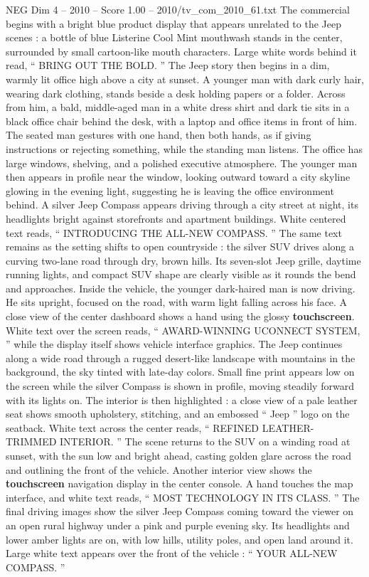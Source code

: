 \begin{textsample}{NEG Dim 4 – 2010 – Score 1.00 – 2010/tv\_com\_2010\_61.txt}  \label{ex:f4_neg_079}
The commercial begins with a bright blue product display that appears unrelated to the Jeep scenes : a bottle of blue Listerine Cool Mint mouthwash stands in the center, surrounded by small cartoon-like mouth characters.
Large white words behind it read, “ BRING OUT THE BOLD. ” The Jeep story then begins in a dim, warmly lit office high above a city at sunset.
A younger man with dark curly hair, wearing dark clothing, stands beside a desk holding papers or a folder.
Across from him, a bald, middle-aged man in a white dress shirt and dark tie sits in a black office chair behind the desk, with a laptop and office items in front of him.
The seated man gestures with one hand, then both hands, as if giving instructions or rejecting something, while the standing man listens.
The office has large windows, shelving, and a polished executive atmosphere.
The younger man then appears in profile near the window, looking outward toward a city skyline glowing in the evening light, suggesting he is leaving the office environment behind.
A silver Jeep Compass appears driving through a city street at night, its headlights bright against storefronts and apartment buildings.
White centered text reads, “ INTRODUCING THE ALL-NEW COMPASS. ” The same text remains as the setting shifts to open countryside : the silver SUV drives along a curving two-lane road through dry, brown hills.
Its seven-slot Jeep grille, daytime running lights, and compact SUV shape are clearly visible as it rounds the bend and approaches.
Inside the vehicle, the younger dark-haired man is now driving.
He sits upright, focused on the road, with warm light falling across his face.
A close view of the center dashboard shows a hand using the glossy \textbf{touchscreen}.
White text over the screen reads, “ AWARD-WINNING UCONNECT SYSTEM, ” while the display itself shows vehicle interface graphics.
The Jeep continues along a wide road through a rugged desert-like landscape with mountains in the background, the sky tinted with late-day colors.
Small fine print appears low on the screen while the silver Compass is shown in profile, moving steadily forward with its lights on.
The interior is then highlighted : a close view of a pale leather seat shows smooth upholstery, stitching, and an embossed “ Jeep ” logo on the seatback.
White text across the center reads, “ REFINED LEATHER-TRIMMED INTERIOR. ” The scene returns to the SUV on a winding road at sunset, with the sun low and bright ahead, casting golden glare across the road and outlining the front of the vehicle.
Another interior view shows the \textbf{touchscreen} navigation display in the center console.
A hand touches the map interface, and white text reads, “ MOST TECHNOLOGY IN ITS CLASS. ” The final driving images show the silver Jeep Compass coming toward the viewer on an open rural highway under a pink and purple evening sky.
Its headlights and lower amber lights are on, with low hills, utility poles, and open land around it.
Large white text appears over the front of the vehicle : “ YOUR ALL-NEW COMPASS. ”

\end{textsample}
